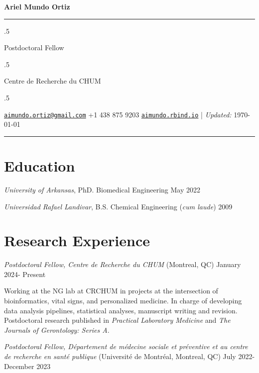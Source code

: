 \documentclass[10pt,]{article}
\begin{document}
\centerline{\huge \bf Ariel Mundo Ortiz}

\vspace{2 mm}

\hrule

\vspace{2 mm}

\moveleft.5\hoffset\centerline{Postdoctoral Fellow}
\moveleft.5\hoffset\centerline{Centre de Recherche du CHUM}
\moveleft.5\hoffset\centerline{ \faEnvelopeO \hspace{1 mm} \href{mailto:}{\tt \href{mailto:aimundo.ortiz@gmail.com}{\nolinkurl{aimundo.ortiz@gmail.com}}} \hspace{1 mm}  \faPhone \hspace{1 mm}  +1
438 875
9203  \hspace{1 mm}       \faGlobe \hspace{1 mm} \href{http://aimundo.rbind.io}{\tt aimundo.rbind.io}    | \emph{Updated:} \apstylekinda\today}



\vspace{2 mm}

\hrule



\section{Education}\label{education}

\emph{University of Arkansas}, PhD. Biomedical Engineering \hfill May
2022

\emph{Universidad Rafael Landivar}, B.S. Chemical Engineering (\emph{cum
laude}) \hfill 2009

\section{Research Experience}\label{research-experience}

\emph{Postdoctoral Fellow, Centre de Recherche du CHUM} (Montreal, QC)
\hfill January 2024- Present

Working at the NG lab at CRCHUM in projects at the intersection of
bioinformatics, vital signs, and personalized medicine. In charge of
developing data analysis pipelines, statistical analyses, manuscript
writing and revision. Postdoctoral research published in \emph{Practical
Laboratory Medicine} and \emph{The Journals of Gerontology: Series A}.

\emph{Postdoctoral Fellow, Département de médecine sociale et préventive
et au centre de recherche en santé publique} (Université de Montréal,
Montreal, QC) \hfill July 2022- December 2023
\end{document}
